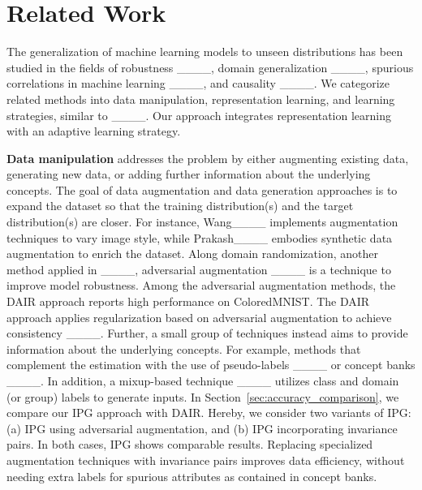 \section{Related Work}
\label{sec:related_work}
%
The generalization of machine learning models to unseen distributions has been studied in the fields of robustness ____, domain generalization ____, spurious correlations in machine learning ____, and causality ____.
We categorize related methods into data manipulation, representation learning, and learning strategies, similar to ____.
Our approach integrates representation learning with an adaptive learning strategy.

\textbf{Data manipulation} addresses the problem by either augmenting existing data, generating new data, or adding further information about the underlying concepts. 
The goal of data augmentation and data generation approaches is to expand the dataset so that the training distribution(s) and the target distribution(s) are closer.
For instance, Wang____ implements augmentation techniques to vary image style, while Prakash____ embodies synthetic data augmentation to enrich the dataset.
Along domain randomization, another method applied in ____, adversarial augmentation ____ is a technique to improve model robustness.
%
Among the adversarial augmentation methods, the DAIR approach reports high performance on ColoredMNIST.
The DAIR approach applies regularization based on adversarial augmentation to achieve consistency ____.
%
Further, a small group of techniques instead aims to provide information about the underlying concepts. 
For example, methods that complement the estimation with the use of pseudo-labels ____ or concept banks ____.
In addition, a mixup-based technique ____ utilizes class and domain (or group) labels to generate inputs. 
%
In Section~\ref{sec:accuracy_comparison}, we compare our IPG approach with DAIR. Hereby, we consider two variants of IPG: (a) IPG using adversarial augmentation, and (b) IPG incorporating invariance pairs. 
In both cases, IPG shows comparable results. 
Replacing specialized augmentation techniques with invariance pairs improves data efficiency, without needing extra labels for spurious attributes as contained in concept banks.


